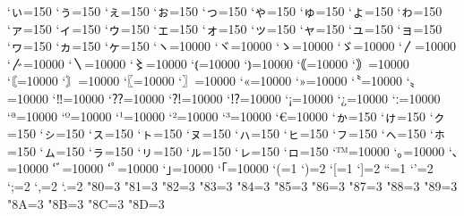 \prebreakpenalty`ぃ=150
\prebreakpenalty`ぅ=150
\prebreakpenalty`ぇ=150
\prebreakpenalty`ぉ=150
\prebreakpenalty`っ=150
\prebreakpenalty`ゃ=150
\prebreakpenalty`ゅ=150
\prebreakpenalty`ょ=150
\prebreakpenalty`ゎ=150%
\prebreakpenalty`ァ=150
\prebreakpenalty`ィ=150
\prebreakpenalty`ゥ=150
\prebreakpenalty`ェ=150
\prebreakpenalty`ォ=150
\prebreakpenalty`ッ=150
\prebreakpenalty`ャ=150
\prebreakpenalty`ュ=150
\prebreakpenalty`ョ=150
\prebreakpenalty`ヮ=150%
\prebreakpenalty`ヵ=150%
\prebreakpenalty`ヶ=150%
\prebreakpenalty`ヽ=10000
\prebreakpenalty`ヾ=10000
\prebreakpenalty`ゝ=10000
\prebreakpenalty`ゞ=10000
\prebreakpenalty`〳=10000
\prebreakpenalty`〴=10000
\prebreakpenalty`〵=10000
\prebreakpenalty`〻=10000
\postbreakpenalty`⦅=10000
\prebreakpenalty`⦆=10000
\postbreakpenalty`｟=10000
\prebreakpenalty`｠=10000
\postbreakpenalty`〘=10000
\prebreakpenalty`〙=10000
\postbreakpenalty`〖=10000
\prebreakpenalty`〗=10000
\postbreakpenalty`«=10000
\prebreakpenalty`»=10000
\postbreakpenalty`〝=10000
\prebreakpenalty`〟=10000
\prebreakpenalty`‼=10000
\prebreakpenalty`⁇=10000
\prebreakpenalty`⁈=10000
\prebreakpenalty`⁉=10000
\postbreakpenalty`¡=10000
\postbreakpenalty`¿=10000
\prebreakpenalty`ː=10000
\prebreakpenalty`ª=10000
\prebreakpenalty`º=10000
\prebreakpenalty`¹=10000
\prebreakpenalty`²=10000
\prebreakpenalty`³=10000
\postbreakpenalty`€=10000
\prebreakpenalty`ゕ=150
\prebreakpenalty`ゖ=150
\prebreakpenalty`ㇰ=150
\prebreakpenalty`ㇱ=150
\prebreakpenalty`ㇲ=150
\prebreakpenalty`ㇳ=150
\prebreakpenalty`ㇴ=150
\prebreakpenalty`ㇵ=150
\prebreakpenalty`ㇶ=150
\prebreakpenalty`ㇷ=150
\prebreakpenalty`ㇸ=150
\prebreakpenalty`ㇹ=150
\prebreakpenalty`ㇺ=150
\prebreakpenalty`ㇻ=150
\prebreakpenalty`ㇼ=150
\prebreakpenalty`ㇽ=150
\prebreakpenalty`ㇾ=150
\prebreakpenalty`ㇿ=150
\prebreakpenalty`™=10000
\prebreakpenalty`｡=10000
\prebreakpenalty`､=10000
\prebreakpenalty`ﾞ=10000
\prebreakpenalty`ﾟ=10000
\prebreakpenalty`｣=10000
\postbreakpenalty`｢=10000
\xspcode`(=1
\xspcode`)=2
\xspcode`[=1
\xspcode`]=2
\xspcode``=1
\xspcode`'=2
\xspcode`;=2
\xspcode`,=2
\xspcode`.=2
\xspcode"80=3
\xspcode"81=3
\xspcode"82=3
\xspcode"83=3
\xspcode"84=3
\xspcode"85=3
\xspcode"86=3
\xspcode"87=3
\xspcode"88=3
\xspcode"89=3
\xspcode"8A=3
\xspcode"8B=3
\xspcode"8C=3
\xspcode"8D=3
